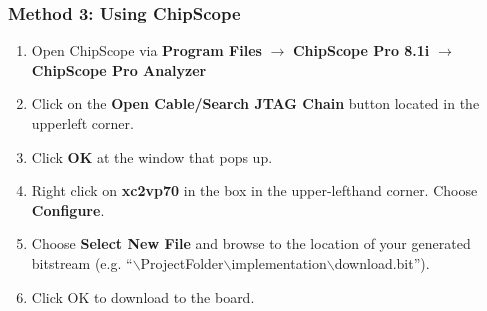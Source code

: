 		\subsubsection{Method 3: Using ChipScope}
			\begin{enumerate}
				
				\item Open ChipScope via \textbf{Program Files} $\rightarrow$ \textbf{ChipScope Pro 8.1i} $\rightarrow$ \textbf{ChipScope Pro Analyzer}
				
				\item Click on the \textbf{Open Cable/Search JTAG Chain} button located in the upperleft corner.
				\item Click \textbf{OK} at the window that pops up.
				
				\item Right click on \textbf{xc2vp70} in the box in the upper-lefthand corner. Choose \textbf{Configure}.
				
				\item Choose \textbf{Select New File} and browse to the location of your generated bitstream (e.g. ``$\backslash$ProjectFolder$\backslash$implementation$\backslash$download.bit'').
				
				\item Click OK to download to the board.
			\end{enumerate}